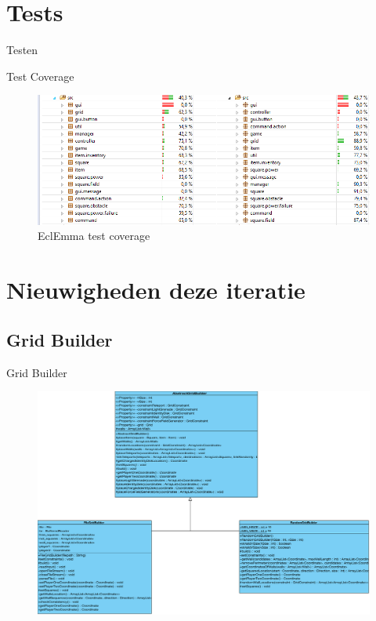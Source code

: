 \documentclass[t]{beamer}
\begin{document}
\section{Tests}

\begin{frame}{Testen}
\begin{multicols}{2}
\tableofcontents[currentsection]
\end{multicols}
\end{frame}

\begin{frame}{Test Coverage}
\begin{figure}[h!]
	\center
	\includegraphics[width= 0.9\linewidth]{img/coverage.png}
	\caption{EclEmma test coverage}
\end{figure}
\end{frame}

\section{Nieuwigheden deze iteratie}

\subsection{Grid Builder}
\begin{frame}{Grid Builder}
\begin{figure}
	\center
	\includegraphics[width= 0.7\linewidth]{img/gridbuilder.pdf}
\end{figure}
\end{frame}
\end{document}
